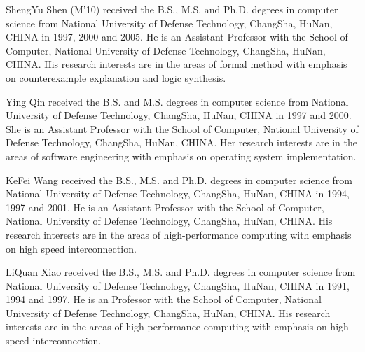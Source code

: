 \documentclass[journal]{IEEEtran}
\begin{document}
\begin{IEEEbiography}{ShengYu Shen}
(M'10) received the B.S., M.S.
and Ph.D. degrees in computer science from
National University of Defense Technology, ChangSha, HuNan, CHINA in 1997, 2000 and 2005.
He is an Assistant Professor with the School of Computer,
National University of Defense Technology, ChangSha, HuNan, CHINA.
His research
interests are in the areas of formal method with emphasis on counterexample explanation
and logic synthesis.
\end{IEEEbiography}

\begin{IEEEbiographynophoto}{Ying Qin}
 received the B.S. and M.S.
degrees in computer science from
National University of Defense Technology, ChangSha, HuNan, CHINA in 1997 and 2000.
She is an Assistant Professor with the School of Computer,
National University of Defense Technology, ChangSha, HuNan, CHINA.
Her research
interests are in the areas of software engineering with emphasis on operating system implementation.
\end{IEEEbiographynophoto}
\newpage
\begin{IEEEbiographynophoto}{KeFei Wang}
received the B.S., M.S.
and Ph.D. degrees in computer science from
National University of Defense Technology, ChangSha, HuNan, CHINA in 1994, 1997 and 2001.
He is an Assistant Professor with the School of Computer,
National University of Defense Technology, ChangSha, HuNan, CHINA.
His research
interests are in the areas of high-performance computing with emphasis on high speed interconnection.
\end{IEEEbiographynophoto}

\begin{IEEEbiographynophoto}{LiQuan Xiao}
received the B.S., M.S.
and Ph.D. degrees in computer science from
National University of Defense Technology, ChangSha, HuNan, CHINA in 1991, 1994 and 1997.
He is an Professor with the School of Computer,
National University of Defense Technology, ChangSha, HuNan, CHINA.
His research
interests are in the areas of high-performance computing with emphasis on high speed interconnection.
\end{IEEEbiographynophoto}
\end{document}
